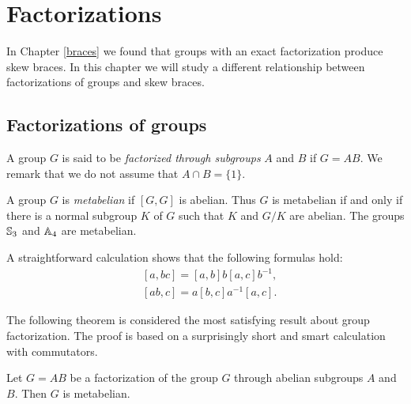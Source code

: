 \chapter{Factorizations}
\label{factorizations}

In Chapter \ref{braces} we found that groups with an exact factorization 
produce skew braces. In this chapter we will study a different relationship between
factorizations of groups and skew braces. 


\section{Factorizations of groups}


A group $G$ is said to be 
{\em factorized through subgroups} $A$ and $B$ if $G=AB$. We remark that we do not assume that
$A\cap B=\{1\}$. 

A group $G$ is {\em metabelian} if $[G,G]$ is abelian. 
Thus $G$ is metabelian if and only if there is a normal subgroup 
$K$ of $G$ such that $K$ and $G/K$ are abelian. 
The groups $\mathbb{S}_3$ and $\mathbb{A}_4$ are metabelian. 


A straightforward calculation shows that 
the following formulas hold: 
\begin{align*}
&[a,bc]=[a,b]b[a,c]b^{-1},\\ 
&[ab,c]=a[b,c]a^{-1}[a,c].
\end{align*}

The following theorem is considered the most satisfying result about group factorization. The proof
is based on a surprisingly short and smart calculation with commutators. 

\begin{theorem}[It\^o]
	\label{theorem:Ito}
	Let $G=AB$ be a factorization of the group $G$ through abelian subgroups $A$ and $B$. 
	Then $G$ is metabelian.
\end{theorem}

